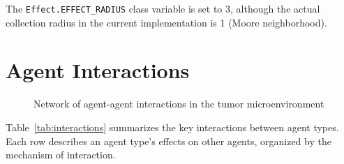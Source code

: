 The \texttt{Effect.EFFECT\_RADIUS} class variable is set to 3, although the actual collection radius in the current implementation is 1 (Moore neighborhood).

\section{Agent Interactions}
\label{sec:md_interactions}

\begin{figure}[htbp]
\centering
{}
\caption{Network of agent-agent interactions in the tumor microenvironment}
\label{fig:agent_interactions}
\end{figure}

Table~\ref{tab:interactions} summarizes the key interactions between agent types. Each row describes an agent type's effects on other agents, organized by the mechanism of interaction.

